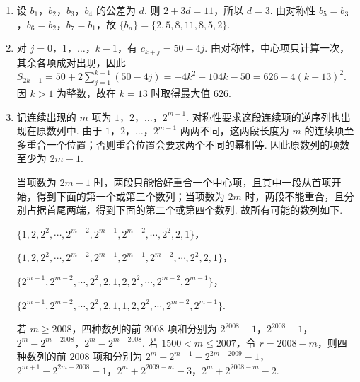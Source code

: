 \begin{solution}
\begin{enumerate}
\item 设 \(b_1\)，\(b_2\)，\(b_3\)，\(b_4\) 的公差为 \(d\). 则 \(2+3d=11\)，所以 \(d=3\). 由对称性 \(b_5=b_3\)，\(b_6=b_2\)，\(b_7=b_1\)，故 \(\{b_n\}=\{2,5,8,11,8,5,2\}\).
\item 对 \(j=0\)，\(1\)，\(\ldots\)，\(k-1\)，有 \(c_{k+j}=50-4j\). 由对称性，中心项只计算一次，其余各项成对出现，因此 \(S_{2k-1}=50+2\sum_{j=1}^{k-1}(50-4j)=-4k^2+104k-50=626-4(k-13)^2\). 因 \(k>1\) 为整数，故在 \(k=13\) 时取得最大值 \(626\).
\item 记连续出现的 \(m\) 项为 \(1\)，\(2\)，\(\ldots\)，\(2^{m-1}\). 对称性要求这段连续项的逆序列也出现在原数列中. 由于 \(1\)，\(2\)，\(\ldots\)，\(2^{m-1}\) 两两不同，这两段长度为 \(m\) 的连续项至多重合一个位置；否则重合位置会要求两个不同的幂相等. 因此原数列的项数至少为 \(2m-1\).

当项数为 \(2m-1\) 时，两段只能恰好重合一个中心项，且其中一段从首项开始，得到下面的第一个或第三个数列；当项数为 \(2m\) 时，两段不能重合，且分别占据首尾两端，得到下面的第二个或第四个数列. 故所有可能的数列如下.

\(\{1,2,2^2,\cdots,2^{m-2},2^{m-1},2^{m-2},\cdots,2^2,2,1\}\)，

\(\{1,2,2^2,\cdots,2^{m-2},2^{m-1},2^{m-1},2^{m-2},\cdots,2^2,2,1\}\)，

\(\{2^{m-1},2^{m-2},\cdots,2^2,2,1,2,2^2,\cdots,2^{m-2},2^{m-1}\}\)，

\(\{2^{m-1},2^{m-2},\cdots,2^2,2,1,1,2,2^2,\cdots,2^{m-2},2^{m-1}\}\).

若 \(m\geqslant2008\)，四种数列的前 \(2008\) 项和分别为 \(2^{2008}-1\)，\(2^{2008}-1\)，\(2^m-2^{m-2008}\)，\(2^m-2^{m-2008}\). 若 \(1500<m\leqslant2007\)，令 \(r=2008-m\)，则四种数列的前 \(2008\) 项和分别为 \(2^m+2^{m-1}-2^{2m-2009}-1\)，\(2^{m+1}-2^{2m-2008}-1\)，\(2^m+2^{2009-m}-3\)，\(2^m+2^{2008-m}-2\).
\end{enumerate}
\end{solution}

